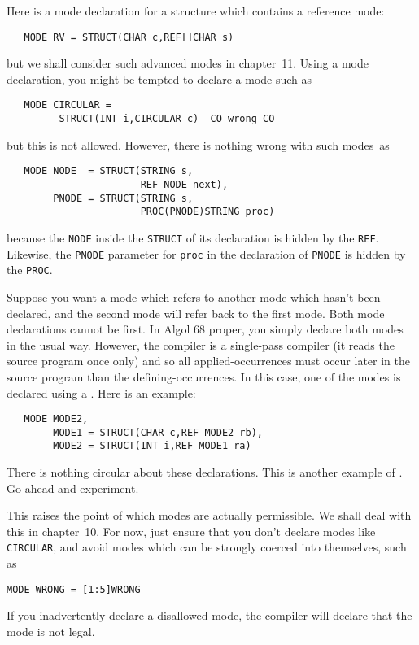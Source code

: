 Here is a mode declaration for a structure which contains a reference
mode:
\begin{verbatim}
   MODE RV = STRUCT(CHAR c,REF[]CHAR s)
\end{verbatim}
\noindent
but we shall consider such advanced modes in chapter~11. Using a mode
declaration, you might be tempted to declare a mode such as
\begin{verbatim}
   MODE CIRCULAR =
         STRUCT(INT i,CIRCULAR c)  CO wrong CO
\end{verbatim}
\noindent
but this is not allowed. However, there is nothing wrong with such
modes~as
\begin{verbatim}
   MODE NODE  = STRUCT(STRING s,
                       REF NODE next),
        PNODE = STRUCT(STRING s,
                       PROC(PNODE)STRING proc)
\end{verbatim}
\noindent
because the \verb|NODE| inside the \verb|STRUCT| of its declaration
is hidden by the \verb|REF|. Likewise, the \verb|PNODE| parameter for
\verb|proc| in the declaration of \verb|PNODE| is hidden by the
\verb|PROC|.

Suppose you want a mode which refers to another mode which hasn't
been declared, and the second mode will refer back to the first mode.
Both mode declarations cannot be first. In Algol 68 proper, you
simply declare both modes in the usual way. However, the
compiler is a single-pass compiler (it reads the source program once
only) and so all applied-occurrences must occur later in the source
program than the defining-occurrences. In this case, one of the modes
is declared using a .
Here is an example:
\begin{verbatim}
   MODE MODE2,
        MODE1 = STRUCT(CHAR c,REF MODE2 rb),
        MODE2 = STRUCT(INT i,REF MODE1 ra)
\end{verbatim}
\noindent
There is nothing circular about these declarations.  This is another
example of .  Go ahead and experiment.

This raises the point of which modes are actually permissible. We
shall deal with this in chapter~10. For now, just ensure that you
don't declare modes like \verb|CIRCULAR|, and avoid modes which can
be strongly coerced into themselves, such as
\begin{verbatim}
MODE WRONG = [1:5]WRONG
\end{verbatim}
\noindent
If you inadvertently declare a disallowed mode, the compiler will
declare that the mode is not legal.

